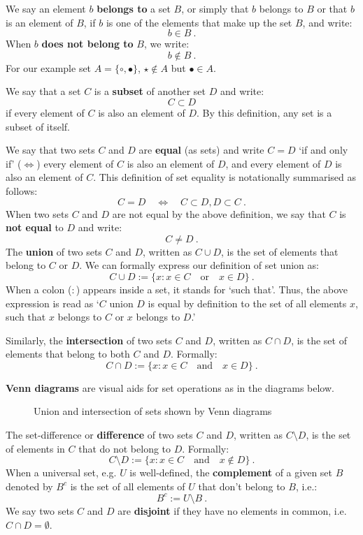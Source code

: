 We say an element $b$ {\bf belongs to} a set $B$, or simply that $b$ belongs to $B$ or that $b$ is an element of $B$, if $b$ is one of the elements that make up the set $B$, and write:
\[
\boxed{
b \in B
} \ .
\]
When $b$ {\bf does not belong to} $B$, we write:
\[
\boxed{
b \notin B
} \ .
\]
For our example set $A = \{\circ, \bullet\}$, $\star \notin A$ but $\bullet \in A$.  

We say that a set $C$ is a {\bf subset} of another set $D$ and write:
\[
\boxed{
C \subset D
}
\]
if every element of $C$ is also an element of $D$.  By this definition, any set is a subset of itself.

We say that two sets $C$ and $D$ are {\bf equal} (as sets) and write $C=D$ `if and only if' ($\iff$) every element of $C$ is also an element of $D$, and every element of $D$ is also an element of $C$.  This definition of set equality is notationally summarised as follows:
\[
\boxed{
C=D \quad \iff \quad C \subset D , D \subset C
} \ .
\]
When two sets $C$ and $D$ are not equal by the above definition, we say that $C$ is {\bf not equal} to $D$ and write:
\[
\boxed{
C \neq D
} \ .
\]
The {\bf union} of two sets $C$ and $D$, written as $C \cup D$, is the set of elements that belong to $C$ or $D$.  We can formally express our definition of set union as:
\[
\boxed{
C \cup D := \{x: x \in C \quad \text{or} \quad x\in D \} 
} \ .
\]
When a colon ($:$) appears inside a set, it stands for `such that'.  Thus, the above expression is read as `$C$ union $D$ is equal by definition to the set of all elements $x$, such that $x$ belongs to $C$ or $x$ belongs to $D$.'

Similarly, the {\bf intersection} of two sets $C$ and $D$, written as $C \cap D$, is the set of elements that belong to both $C$ and $D$.  Formally:
\[
\boxed{
C \cap D := \{x: x \in C \quad \text{and} \quad x\in D \}
} \ .
\]

{\bf Venn diagrams} are visual aids for set operations as in the diagrams below.

\begin{figure}[htbp]
\centering
\caption{Union and intersection of sets shown by Venn diagrams}
\end{figure}



The set-difference or {\bf difference} of two sets $C$ and $D$, written as $C \setminus D$, is the set of elements in $C$ that do not belong to $D$.  Formally:
\[
\boxed{
C \setminus D := \{x: x \in C \quad \text{and} \quad x\notin D \}
} \ .
\] 
When a universal set, e.g. $U$ is well-defined, the {\bf complement} of a given set $B$ denoted by $B^c$ is the set of all elements of $U$ that don't belong to $B$, i.e.:
\[
\boxed{
B^c := U \setminus B
} \ .
\]
We say two sets $C$ and $D$ are {\bf disjoint} if they have no elements in common, i.e.~$C \cap D = \emptyset$.

